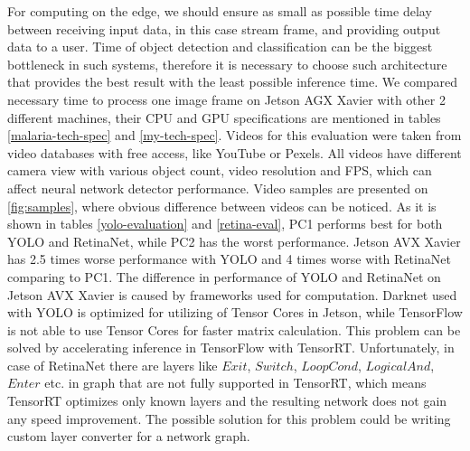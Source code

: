 \documentclass[twoside]{ctuthesis}
\theoremstyle{plain}
\theoremstyle{definition}
\theoremstyle{note}
\begin{document}
For computing on the edge, we should ensure as small as possible time delay between receiving input data, in this case stream frame,  and providing output data to a user. Time of object detection and classification can be the biggest bottleneck in such systems, therefore it is necessary to choose such architecture that provides the best result with the least possible inference time. We compared necessary time to process one image frame on Jetson AGX Xavier with other 2 different machines, their CPU and GPU specifications are mentioned in tables \ref{malaria-tech-spec} and \ref{my-tech-spec}. Videos for this evaluation were taken from video databases with free access, like YouTube or Pexels. All videos have different camera view with various object count, video resolution and FPS, which can affect neural network detector performance. Video samples are presented on \ref{fig:samples}, where obvious difference between videos can be noticed.  As it is shown in tables \ref{yolo-evaluation} and \ref{retina-eval}, PC1 performs best for both YOLO and RetinaNet, while PC2 has the worst performance. Jetson AVX Xavier has 2.5 times worse performance with YOLO and 4 times worse with RetinaNet comparing to PC1. The difference in performance of YOLO and RetinaNet on Jetson AVX Xavier is caused by frameworks used for computation. Darknet used with YOLO is optimized for utilizing of Tensor Cores in Jetson, while TensorFlow is not able to use Tensor Cores for faster matrix calculation. This problem can be solved by accelerating inference in TensorFlow with TensorRT. Unfortunately, in case of RetinaNet there are layers like $Exit$, $Switch$, $LoopCond$, $LogicalAnd$, $Enter$ etc. in graph that are not fully supported in TensorRT, which means TensorRT optimizes only known layers and the resulting network does not gain any speed improvement. The possible solution for this problem could be writing custom layer converter for a network graph.


\begin{table}[htb]
	\centering
	\caption{PC1 technical specification}
	\label{malaria-tech-spec}
\end{table}
\end{document}
